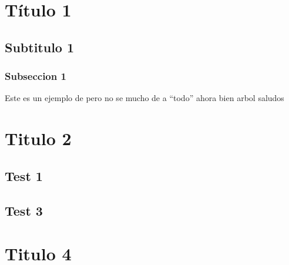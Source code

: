%
%

\section{Título 1}
	\subsection{Subtitulo 1}
		\subsubsection{Subseccion 1}
		
		Este es un ejemplo de  pero no se mucho de  a ``todo'' ahora \codigodelcurso bien arbol \nombredelinforme saludos
		
\section{Titulo 2}
	\vspace{14cm}
	
	\lipsum[1]
	\subsection{Test 1}
	\subsection{Test 3}
	
\newpage
\section{Titulo 4}